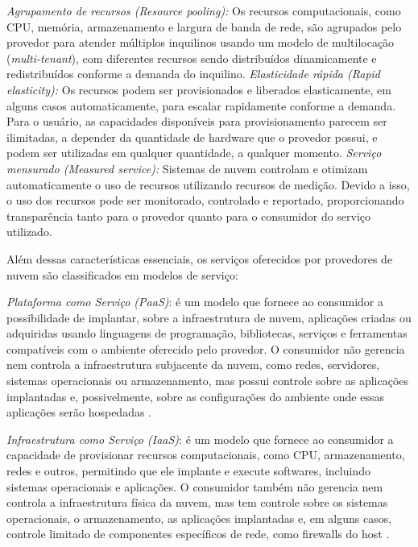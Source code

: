 \emph{Agrupamento de recursos (\textit{Resource pooling}):} Os recursos computacionais, como CPU, memória, armazenamento e largura de banda de rede, são agrupados pelo provedor para atender múltiplos inquilinos usando um modelo de multilocação (\textit{multi-tenant}), com diferentes recursos sendo distribuídos dinamicamente e redistribuídos conforme a demanda do inquilino.
\emph{Elasticidade rápida (\textit{Rapid elasticity}):} Os recursos podem ser provisionados e liberados elasticamente, em alguns casos automaticamente, para escalar rapidamente conforme a demanda. Para o usuário, as capacidades disponíveis para provisionamento parecem ser ilimitadas, a depender da quantidade de hardware que o provedor possui,  e podem ser utilizadas em qualquer quantidade, a qualquer momento. 
\emph{Serviço mensurado (\textit{Measured service}):} Sistemas de nuvem controlam e otimizam automaticamente o uso de recursos utilizando recursos de medição. Devido a isso, o uso dos recursos pode ser monitorado, controlado e reportado, proporcionando transparência tanto para o provedor quanto para o consumidor do serviço utilizado. 

Além dessas características essenciais, os serviços oferecidos por provedores de nuvem são classificados em modelos de serviço:

\emph{Plataforma como Serviço (\textit{PaaS})}: é um modelo que fornece ao consumidor a possibilidade de implantar, sobre a infraestrutura de nuvem, aplicações criadas ou adquiridas usando linguagens de programação, bibliotecas, serviços e ferramentas compatíveis com o ambiente oferecido pelo provedor. O consumidor não gerencia nem controla a infraestrutura subjacente da nuvem, como redes, servidores, sistemas operacionais ou armazenamento, mas possui controle sobre as aplicações implantadas e, possivelmente, sobre as configurações do ambiente onde essas aplicações serão hospedadas \cite{mell2011}.

\emph{Infraestrutura como Serviço (\textit{IaaS})}: é um modelo que fornece ao consumidor a capacidade de provisionar recursos computacionais, como CPU, armazenamento, redes e outros, permitindo que ele implante e execute softwares, incluindo sistemas operacionais e aplicações. O consumidor também não gerencia nem controla a infraestrutura física da nuvem, mas tem controle sobre os sistemas operacionais, o armazenamento, as aplicações implantadas e, em alguns casos, controle limitado de componentes específicos de rede, como firewalls do host \cite{mell2011}.

